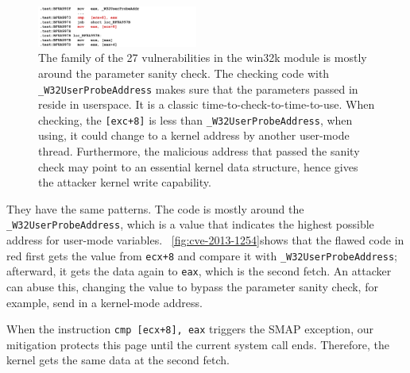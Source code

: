 \begin{figure}[th]
  \includegraphics[width=0.47\textwidth]{figures/cve-2013-1254}
  \centering
  \caption{The family of the 27 vulnerabilities in the win32k module is mostly around the parameter sanity check. The checking code with \texttt{\_W32UserProbeAddress} makes sure that the parameters passed in reside in userspace. It is a classic time-to-check-to-time-to-use. When checking, the \texttt{[exc+8]} is less than \texttt{\_W32UserProbeAddress}, when using, it could change to a kernel address by another user-mode thread. Furthermore, the malicious address that passed the sanity check may point to an essential kernel data structure, hence gives the attacker kernel write capability.}
  \label{fig:cve-2013-1254}
\end{figure}


They have the same patterns. The code is mostly around the \texttt{\_W32UserProbeAddress}, which is a value that indicates the highest possible address for user-mode variables. ~\autoref{fig:cve-2013-1254}shows that the flawed code in red first gets the value from \texttt{ecx+8} and compare it with \texttt{\_W32UserProbeAddress}; afterward, it gets the data again to \texttt{eax}, which is the second fetch. An attacker can abuse this, changing the value to bypass the parameter sanity check, for example, send in a kernel-mode address.


When the instruction \texttt{cmp [ecx+8], eax} triggers the SMAP exception, our mitigation protects this page until the current system call ends. Therefore, the kernel gets the same data at the second fetch.

